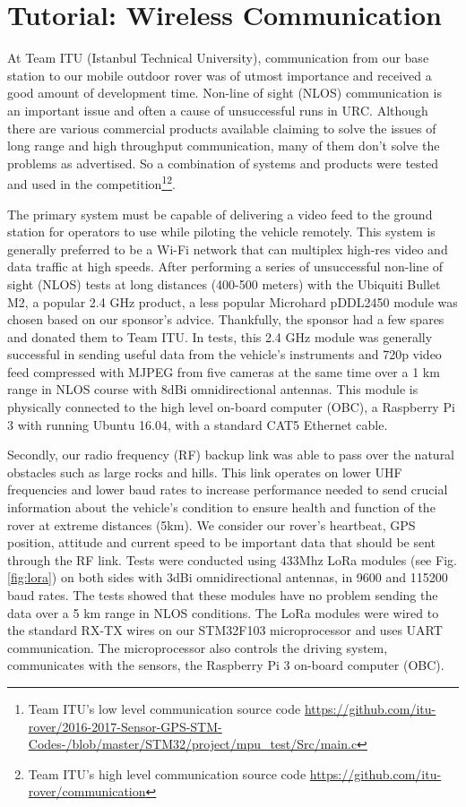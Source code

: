 \documentclass[runningheads,a4paper]{llncs}
\begin{document}
\section{Tutorial: Wireless Communication}\label{wireless}

At Team ITU (Istanbul Technical University), communication from our base station to our mobile outdoor rover was of utmost importance and received a good amount of development time. Non-line of sight (NLOS) communication is an important issue and often a cause of unsuccessful runs in URC. Although there are various commercial products available claiming to solve the issues of long range and high throughput communication, many of them don't solve the problems as advertised. So a combination of systems and products were tested and used in the competition\footnote{Team ITU's low level communication source code \url{https://github.com/itu-rover/2016-2017-Sensor-GPS-STM-Codes-/blob/master/STM32/project/mpu_test/Src/main.c}}\footnote{Team ITU's high level communication source code \url{https://github.com/itu-rover/communication}}.

The primary system must be capable of delivering a video feed to the ground station for operators to use while piloting the vehicle remotely. This system is generally preferred to be a Wi-Fi network that can multiplex high-res video and data traffic at high speeds. After performing a series of unsuccessful non-line of sight (NLOS) tests at long distances (400-500 meters) with the Ubiquiti Bullet M2, a popular 2.4 GHz product, a less popular Microhard pDDL2450 module was chosen based on our sponsor's advice. Thankfully, the sponsor had a few spares and donated them to Team ITU. In tests, this 2.4 GHz module was generally successful in sending useful data from the vehicle's instruments and 720p video feed compressed with MJPEG from five cameras at the same time over a 1 km range in NLOS course with 8dBi omnidirectional antennas. This module is physically connected to the high level on-board computer (OBC), a Raspberry Pi 3 with running Ubuntu 16.04, with a standard CAT5 Ethernet cable.

Secondly, our radio frequency (RF) backup link was able to pass over the natural obstacles such as large rocks and hills. This link operates on lower UHF frequencies and lower baud rates to increase performance needed to send crucial information about the vehicle's condition to ensure health and function of the rover at extreme distances (5km). We consider our rover's heartbeat, GPS position, attitude and current speed to be important data that should be sent through the RF link. Tests were conducted using 433Mhz LoRa modules (see Fig. \ref{fig:lora}) on both sides with 3dBi omnidirectional antennas, in 9600 and 115200 baud rates. The tests showed that these modules have no problem sending the data over a 5 km range in NLOS conditions. The LoRa modules were wired to the standard RX-TX wires on our STM32F103 microprocessor and uses UART communication. The microprocessor also controls the driving system, communicates with the sensors, the Raspberry Pi 3 on-board computer (OBC). 
\end{document}

